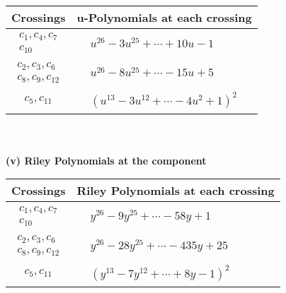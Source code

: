 \documentclass[1p]{elsarticle_modified}
\theoremstyle{definition}
\begin{document}
\begin{tabular}{m{50pt}|m{274pt}}
Crossings & \hspace{64pt}u-Polynomials at each crossing \\
\hline $$\begin{aligned}c_{1},c_{4},c_{7}\\c_{10}\end{aligned}$$&$\begin{aligned}
&u^{26}-3 u^{25}+\cdots+10 u-1
\end{aligned}$\\
\hline $$\begin{aligned}c_{2},c_{3},c_{6}\\c_{8},c_{9},c_{12}\end{aligned}$$&$\begin{aligned}
&u^{26}-8 u^{25}+\cdots-15 u+5
\end{aligned}$\\
\hline $$\begin{aligned}c_{5},c_{11}\end{aligned}$$&$\begin{aligned}
&(u^{13}-3 u^{12}+\cdots-4 u^2+1)^{2}
\end{aligned}$\\
\hline
\end{tabular}\\~\\
\newpage\renewcommand{\arraystretch}{1}
\flushleft \textbf{(v) Riley Polynomials at the component}\newline \\
\begin{tabular}{m{50pt}|m{274pt}}
Crossings & \hspace{64pt}Riley Polynomials at each crossing \\
\hline $$\begin{aligned}c_{1},c_{4},c_{7}\\c_{10}\end{aligned}$$&$\begin{aligned}
&y^{26}-9 y^{25}+\cdots-58 y+1
\end{aligned}$\\
\hline $$\begin{aligned}c_{2},c_{3},c_{6}\\c_{8},c_{9},c_{12}\end{aligned}$$&$\begin{aligned}
&y^{26}-28 y^{25}+\cdots-435 y+25
\end{aligned}$\\
\hline $$\begin{aligned}c_{5},c_{11}\end{aligned}$$&$\begin{aligned}
&(y^{13}-7 y^{12}+\cdots+8 y-1)^{2}
\end{aligned}$\\
\hline
\end{tabular}\\~\\
\end{document}
